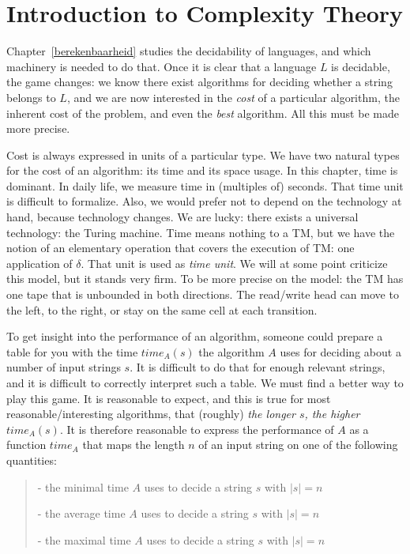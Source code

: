 \chapter{Introduction to Complexity Theory}

Chapter~\ref{berekenbaarheid} studies the decidability of
languages, and which machinery is needed to do that. Once it is clear
that a language $L$ is decidable, the game changes: we know there
exist algorithms for deciding whether a string belongs to $L$, and we
are now interested in the {\em cost} of a particular algorithm, the
inherent cost of the problem, and even the {\em best} algorithm. All
this must be made more precise.

Cost is always expressed in units of a particular type. We have two
natural types for the cost of an algorithm: its time and its space
usage. In this chapter, time is dominant. In daily life, we measure
time in (multiples of) seconds. That time unit is difficult to
formalize. Also, we would prefer not to depend on the technology at
hand, because technology changes. We are lucky: there exists a
universal technology: the Turing machine. Time means nothing to a TM,
but we have the notion of an elementary operation that covers the
execution of TM: one application of $\delta$. That unit is used as
{\em time unit}. We will at some point criticize this model, but it
stands very firm. To be more precise on the model: the TM has one
tape that is unbounded in both directions. The read/write head can
move to the left, to the right, or stay on the same cell at each
transition.

To get insight into the performance of an algorithm, someone could
prepare a table for you with the time $time_A(s)$ the algorithm $A$
uses for deciding about a number of input strings $s$.
It is difficult to do that for enough relevant strings, and it is
difficult to correctly interpret such a table. We must find a better
way to play this game. It is reasonable to expect, and this is true
for most reasonable/interesting algorithms, that (roughly) {\em the
longer $s$, the higher $time_A(s)$}. It is therefore reasonable to
express the performance of $A$ as a function $time_A$ that maps the
length $n$ of an input string on one of the following quantities:

\begin{verse}
- the minimal time $A$ uses to decide a  string $s$ with $|s| = n$

- the average time $A$ uses to decide a  string $s$ with $|s| = n$

- the maximal time $A$ uses to decide a  string $s$ with $|s| = n$
\end{verse}

